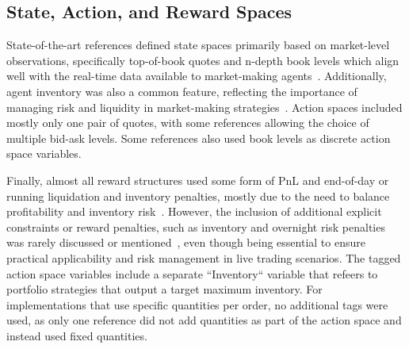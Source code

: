\subsection{State, Action, and Reward Spaces}
\label{subsec:state-action-and-reward-spaces}
State-of-the-art references defined state spaces primarily based on market-level observations,
specifically top-of-book quotes and n-depth book levels which align well with the real-time data available to market-making agents~\cite{He2023, Bakshaev2020}.
Additionally, agent inventory was also a common feature, reflecting the importance of managing risk and liquidity in market-making strategies~\cite{Patel2018, Ganesh2019}.
Action spaces included mostly only one pair of quotes, with some references allowing the choice of multiple bid-ask levels.
Some references also used book levels as discrete action space variables.

\begin{figure}[H]
    \centering
    \centering
\end{figure}

Finally, almost all reward structures used some form of PnL and end-of-day or running liquidation and inventory penalties,
mostly due to the need to balance profitability and inventory risk~\cite{Sun2022, Gasperov2021}.
However, the inclusion of additional explicit constraints or reward penalties, such as inventory and overnight risk penalties was rarely discussed or mentioned~\citep{Jerome2022a, Selser2021a, Sun2022},
even though being essential to ensure practical applicability and risk management in live trading scenarios.
The tagged action space variables include a separate ``Inventory`` variable that refeers to portfolio strategies that output a target maximum inventory.
For implementations that use specific quantities per order, no additional tags were used, as only one reference did not add quantities as part of the action space and instead used fixed quantities.


